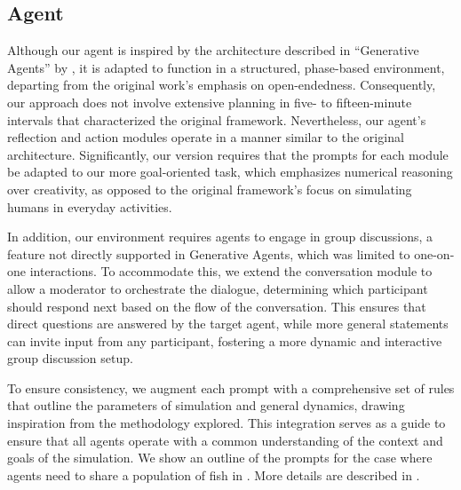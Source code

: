 \documentclass{article}
\begin{document}
\subsection{Agent}
Although our agent is inspired by the architecture described in ``Generative Agents'' by \citet{park2023generative}, it is adapted to function in a structured, phase-based environment, departing from the original work's emphasis on open-endedness. Consequently, our approach does not involve extensive planning in five- to fifteen-minute intervals that characterized the original framework. Nevertheless, our agent's reflection and action modules operate in a manner similar to the original architecture. Significantly, our version requires that the prompts for each module be adapted to our more goal-oriented task, which emphasizes numerical reasoning over creativity, as opposed to the original framework's focus on simulating humans in everyday activities.

In addition, our environment requires agents to engage in group discussions, a feature not directly supported in Generative Agents, which was limited to one-on-one interactions. To accommodate this, we extend the conversation module to allow a moderator to orchestrate the dialogue, determining which participant should respond next based on the flow of the conversation. This ensures that direct questions are answered by the target agent, while more general statements can invite input from any participant, fostering a more dynamic and interactive group discussion setup.

To ensure consistency, we augment each prompt with a comprehensive set of rules that outline the parameters of simulation and general dynamics, drawing inspiration from the methodology \citet{xu2023exploring} explored. This integration serves as a guide to ensure that all agents operate with a common understanding of the context and goals of the simulation. We show an outline of the prompts for the case where agents need to share a population of fish in . More details are described in .
\end{document}
